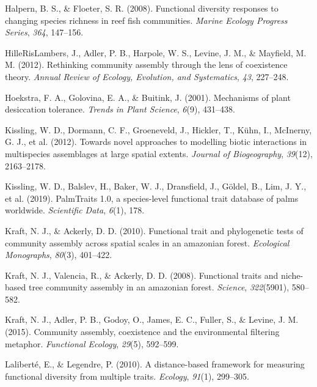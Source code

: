 \documentclass[
]{agujournal2019}
\newlength{\cslhangindent}
\newenvironment{CSLReferences}[2] %
 {\begin{list}{}{%
  \setlength{\itemindent}{0pt}
  \setlength{\leftmargin}{0pt}
  \setlength{\parsep}{0pt}
  \ifodd #1
   \setlength{\leftmargin}{\cslhangindent}
   \setlength{\itemindent}{-1\cslhangindent}
  \fi
  \setlength{\itemsep}{#2\baselineskip}}}
 {\end{list}}
\begin{document}
\begin{CSLReferences}{1}{0}
Halpern, B. S., \& Floeter, S. R. (2008). Functional diversity responses
to changing species richness in reef fish communities. \emph{Marine
Ecology Progress Series}, \emph{364}, 147--156.

HilleRisLambers, J., Adler, P. B., Harpole, W. S., Levine, J. M., \&
Mayfield, M. M. (2012). Rethinking community assembly through the lens
of coexistence theory. \emph{Annual Review of Ecology, Evolution, and
Systematics}, \emph{43}, 227--248.

Hoekstra, F. A., Golovina, E. A., \& Buitink, J. (2001). Mechanisms of
plant desiccation tolerance. \emph{Trends in Plant Science},
\emph{6}(9), 431--438.

Kissling, W. D., Dormann, C. F., Groeneveld, J., Hickler, T., Kühn, I.,
McInerny, G. J., et al. (2012). Towards novel approaches to modelling
biotic interactions in multispecies assemblages at large spatial
extents. \emph{Journal of Biogeography}, \emph{39}(12), 2163--2178.

Kissling, W. D., Balslev, H., Baker, W. J., Dransfield, J., Göldel, B.,
Lim, J. Y., et al. (2019). PalmTraits 1.0, a species-level functional
trait database of palms worldwide. \emph{Scientific Data}, \emph{6}(1),
178.

Kraft, N. J., \& Ackerly, D. D. (2010). Functional trait and
phylogenetic tests of community assembly across spatial scales in an
amazonian forest. \emph{Ecological Monographs}, \emph{80}(3), 401--422.

Kraft, N. J., Valencia, R., \& Ackerly, D. D. (2008). Functional traits
and niche-based tree community assembly in an amazonian forest.
\emph{Science}, \emph{322}(5901), 580--582.

Kraft, N. J., Adler, P. B., Godoy, O., James, E. C., Fuller, S., \&
Levine, J. M. (2015). Community assembly, coexistence and the
environmental filtering metaphor. \emph{Functional Ecology},
\emph{29}(5), 592--599.

Laliberté, E., \& Legendre, P. (2010). A distance-based framework for
measuring functional diversity from multiple traits. \emph{Ecology},
\emph{91}(1), 299--305.


\end{CSLReferences}
\end{document}
